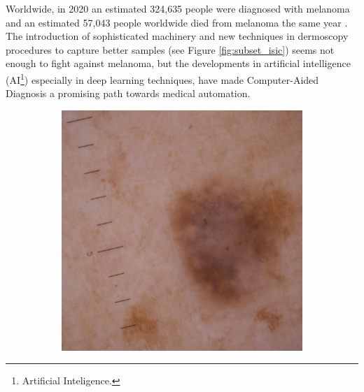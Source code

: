 Worldwide, in 2020 an estimated 324,635 people were diagnosed with melanoma and
an estimated 57,043 people worldwide died from melanoma the same year
\cite{CancerStats}. The introduction of sophisticated machinery and new
techniques in dermoscopy procedures to capture better samples (see Figure
\ref{fig:subset_isic}) seems not enough to fight against melanoma, but the
developments in artificial intelligence (AI\footnote{Artificial Inteligence.})
especially in deep learning techniques, have made Computer-Aided Diagnosis
a promising path towards medical automation.

\begin{figure}[H] \centering
  \begin{subfigure}{0.3\textwidth}
    \includegraphics[width=\textwidth]{imatges/introduction/subset_isic/ISIC_1752943.jpg}
  \end{subfigure}
  \hfill
  \begin{subfigure}{0.3\textwidth}

\end{subfigure}
\end{figure}
